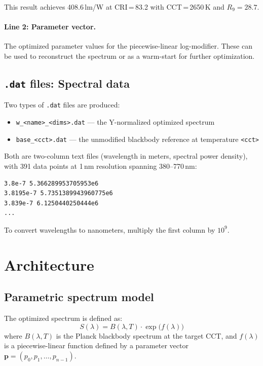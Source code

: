 \documentclass[11pt]{article}
\newcommand{\cmd}[1]{\texttt{#1}}
\newcommand{\file}[1]{\texttt{#1}}
\begin{document}
This result achieves 408.6\,lm/W at CRI\,=\,83.2 with CCT\,=\,2650\,K
and $R_9 = 28.7$.

\paragraph{Line 2: Parameter vector.}  The optimized parameter values
for the piecewise-linear log-modifier.  These can be used to reconstruct
the spectrum or as a warm-start for further optimization.

\subsection{\texttt{.dat} files: Spectral data}

Two types of \file{.dat} files are produced:

\begin{itemize}
  \item \file{w\_<name>\_<dims>.dat} --- the Y-normalized optimized
    spectrum
  \item \file{base\_<cct>.dat} --- the unmodified blackbody reference
    at temperature \cmd{<cct>}
\end{itemize}

Both are two-column text files (wavelength in meters, spectral power
density), with 391 data points at 1\,nm resolution spanning
380--770\,nm:

\begin{lstlisting}[style=output]
3.8e-7 5.366289953705953e6
3.8195e-7 5.7351389943960775e6
3.839e-7 6.1250440250444e6
...
\end{lstlisting}

To convert wavelengths to nanometers, multiply the first column by
$10^9$.

\section{Architecture}
\label{sec:architecture}

\subsection{Parametric spectrum model}

The optimized spectrum is defined as:
\[
  S(\lambda) = B(\lambda, T) \cdot \exp\!\bigl(f(\lambda)\bigr)
\]
where $B(\lambda, T)$ is the Planck blackbody spectrum at the target CCT,
and $f(\lambda)$ is a piecewise-linear function defined by a parameter
vector $\mathbf{p} = (p_0, p_1, \ldots, p_{n-1})$.
\end{document}
